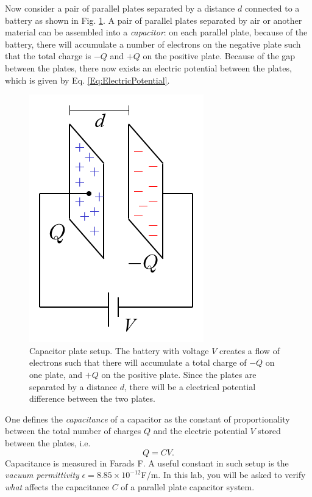 \documentclass[12pt]{report}
\begin{document}
Now consider a pair of parallel plates separated by a distance $d$ connected to a battery as shown in Fig. \ref{Fig:ParallelPlates}. A pair of parallel plates separated by air or another material can be assembled into a \textit{capacitor}: on each parallel plate, because of the battery, there will accumulate a number of electrons on the negative plate such that the total charge is $-Q$ and $+Q$ on the positive plate. Because of the gap between the plates, there now exists an electric potential between the plates, which is given by Eq. \ref{Eq:ElectricPotential}.
\begin{figure}[h]
\centering
\includegraphics[scale=0.6]{lab1-parallel-plates.png}
\caption{Capacitor plate setup. The battery with voltage $V$ creates a flow of electrons such that there will accumulate a total charge of $-Q$ on one plate, and $+Q$ on the positive plate. Since the plates are separated by a distance $d$, there will be a electrical potential difference between the two plates.}
\label{Fig:ParallelPlates}
\end{figure}

One defines the \textit{capacitance} of a capacitor as the constant of proportionality between the total number of charges $Q$ and the electric potential $V$ stored between the plates, i.e. 
\begin{equation}
Q = C V.
\label{capacitor_formula}
\end{equation}
Capacitance is measured in Farads F. A useful constant in such setup is the \textit{vacuum permittivity} $\epsilon = 8.85 \times 10^{-12}$F/m. In this lab, you will be asked to verify \textit{what} affects the capacitance $C$ of a parallel plate capacitor system.
\end{document}
